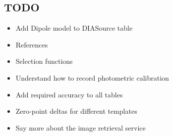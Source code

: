 \documentclass[SE,lsstdraft,toc]{lsstdoc}
\begin{document}
\begin{todo}

\clearpage

\section{TODO}

\begin{itemize}

    \item Add Dipole model to DIASource table
    \item References

    \item Selection functions
    \item Understand how to record photometric calibration
    \item Add required accuracy to all tables

    \item Zero-point deltas for different templates
    \item Say more about the image retrieval service


\end{itemize}

\end{todo}
\end{document}
